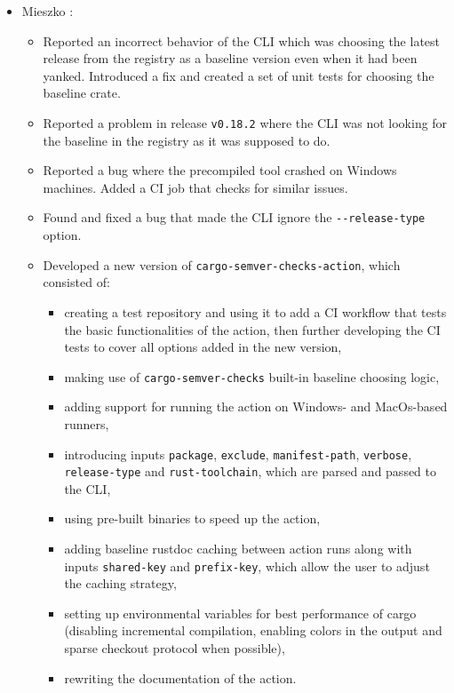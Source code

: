 \documentclass[licencjacka,en]{pracamgr}
\begin{document}
\begin{itemize}
	\item Mieszko \cite{responsibilities-mieszko}:
		\begin{itemize}
			\item Reported an incorrect behavior of the CLI which was choosing the latest release
				from the registry as a baseline version even when it had been yanked.
				Introduced a fix and created a set of unit tests for choosing the baseline crate.
			\item Reported a problem in release \texttt{v0.18.2} where the CLI was not looking for
				the baseline in the registry as it was supposed to do.
			\item Reported a bug where the precompiled tool crashed on Windows machines.
				Added a CI job that checks for similar issues.
			\item Found and fixed a bug that made the CLI ignore the \texttt{-{}-release-type} option.
			\item Developed a new version of \texttt{cargo-semver-checks-action}, which consisted of:
			\begin{itemize}
				\item creating a test repository \cite{responsibilities-mieszko-action-tests}
					and using it to add a CI workflow that tests the basic functionalities of
					the action, then further developing the CI tests to cover all options added in
					the new version,
				\item making use of \texttt{cargo-semver-checks} built-in baseline choosing logic,
				\item adding support for running the action on Windows- and MacOs-based runners,
				\item introducing inputs \texttt{package}, \texttt{exclude}, \texttt{manifest-path},
					\texttt{verbose}, \texttt{release-type} and \texttt{rust-toolchain},
					which are parsed and passed to the CLI,
				\item using pre-built binaries to speed up the action,
				\item adding baseline rustdoc caching between action runs along with
					inputs \texttt{shared-key} and \texttt{prefix-key}, which allow the user
					to adjust the caching strategy,
				\item setting up environmental variables for best performance of cargo (disabling
					incremental compilation, enabling colors in the output and sparse
					checkout protocol when possible),
				\item rewriting the documentation of the action.
			\end{itemize}
		\end{itemize}


\end{itemize}
\end{document}
